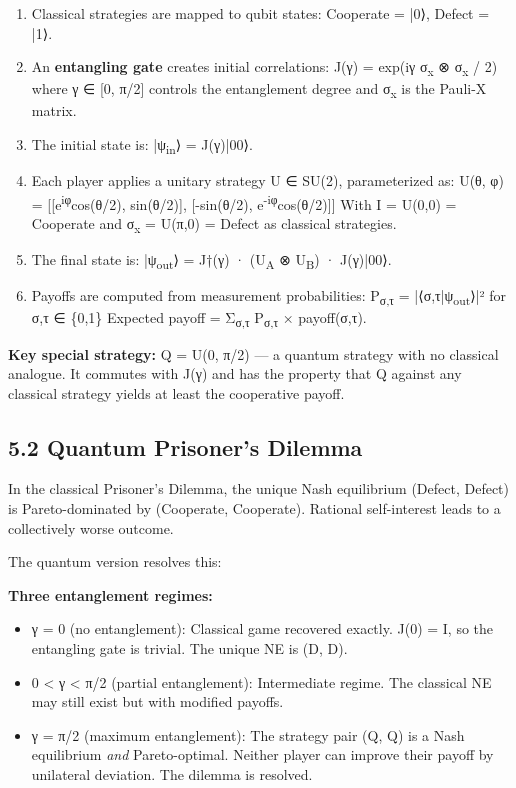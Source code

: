 \documentclass[11pt]{article}
\begin{document}
\begin{enumerate}
\item Classical strategies are mapped to qubit states: Cooperate = |0⟩, Defect = |1⟩.

\item An \textbf{entangling gate} creates initial correlations:
J(γ) = exp(iγ σ\textsubscript{x} ⊗ σ\textsubscript{x} / 2)
where γ ∈ [0, π/2] controls the entanglement degree and σ\textsubscript{x} is the Pauli-X
matrix.

\item The initial state is: |ψ\textsubscript{in}⟩ = J(γ)|00⟩.

\item Each player applies a unitary strategy U ∈ SU(2), parameterized as:
U(θ, φ) = [[e\textsuperscript{iφ}cos(θ/2), sin(θ/2)], [-sin(θ/2), e\textsuperscript{-iφ}cos(θ/2)]]
With I = U(0,0) = Cooperate and σ\textsubscript{x} = U(π,0) = Defect as classical strategies.

\item The final state is: |ψ\textsubscript{out}⟩ = J†(γ) · (U\textsubscript{A} ⊗ U\textsubscript{B}) · J(γ)|00⟩.

\item Payoffs are computed from measurement probabilities:
P\textsubscript{σ,τ} = |⟨σ,τ|ψ\textsubscript{out}⟩|² for σ,τ ∈ \{0,1\}
Expected payoff = Σ\textsubscript{σ,τ} P\textsubscript{σ,τ} × payoff(σ,τ).
\end{enumerate}

\textbf{Key special strategy:} Q = U(0, π/2) --- a quantum strategy with no classical
analogue. It commutes with J(γ) and has the property that Q against any classical
strategy yields at least the cooperative payoff.
\subsection{5.2 Quantum Prisoner's Dilemma}
\label{sec:orga7c6757}

In the classical Prisoner's Dilemma, the unique Nash equilibrium (Defect, Defect)
is Pareto-dominated by (Cooperate, Cooperate). Rational self-interest leads to a
collectively worse outcome.

The quantum version resolves this:

\textbf{Three entanglement regimes:}
\begin{itemize}
\item γ = 0 (no entanglement): Classical game recovered exactly. J(0) = I, so the
entangling gate is trivial. The unique NE is (D, D).
\item 0 < γ < π/2 (partial entanglement): Intermediate regime. The classical NE
may still exist but with modified payoffs.
\item γ = π/2 (maximum entanglement): The strategy pair (Q, Q) is a Nash equilibrium
\emph{and} Pareto-optimal. Neither player can improve their payoff by unilateral
deviation. The dilemma is resolved.
\end{itemize}
\end{document}
